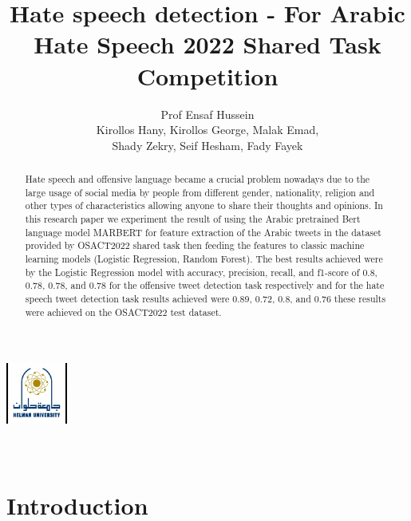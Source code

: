 \documentclass[conference]{IEEEtran}
\title{Hate speech detection - For Arabic Hate Speech 2022 Shared Task Competition}
\author{Prof Ensaf Hussein \\Kirollos Hany, Kirollos George, Malak Emad, \\ Shady Zekry, Seif Hesham, Fady Fayek}
\date{}
\begin{document}
	
\nocite{*}

\onecolumn

\makeatletter
\begin{center}
	\includegraphics[width=2cm, height=2cm]{university.png}\\[4ex]
	{\huge \bfseries  \@title }\\[2ex] 
	{\LARGE  \@author}\\[50ex] 
	{\large \@date}
\end{center}
\makeatother

\clearpage
	
\twocolumn

\begin{abstract}
	Hate speech and offensive language became a crucial problem nowadays due to the large usage of social media by people from different gender, nationality, religion and other types of characteristics allowing anyone to share their thoughts and opinions. In this research paper we experiment the result of using the Arabic pretrained Bert language model MARBERT for feature extraction of the Arabic tweets in the dataset provided by OSACT2022 shared task then feeding the features to classic machine learning models (Logistic Regression, Random Forest). The best results achieved were by the Logistic Regression model with accuracy, precision, recall, and f1-score of 0.8, 0.78, 0.78, and 0.78 for the offensive tweet detection task respectively and for the hate speech tweet detection task results achieved were 0.89, 0.72, 0.8, and 0.76 these results were achieved on the OSACT2022 test dataset.
\end{abstract}

\section{Introduction}
\end{document}
